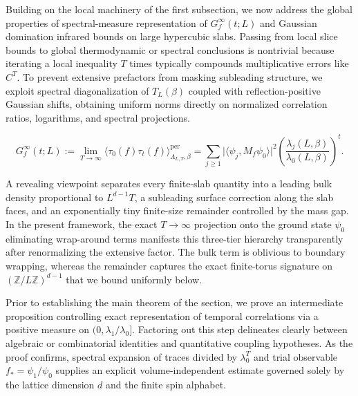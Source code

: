 \documentclass[11pt]{article}
\theoremstyle{definition}
\begin{document}
Building on the local machinery of the first subsection, we now address the global
properties of spectral-measure representation of $G_f^\infty(t; L)$ and Gaussian
domination infrared bounds on large hypercubic slabs. Passing from local slice
bounds to global thermodynamic or spectral conclusions is nontrivial because
iterating a local inequality $T$ times typically compounds multiplicative errors
like $C^T$. To prevent extensive prefactors from masking subleading structure, we
exploit spectral diagonalization of $T_L(\beta)$ coupled with reflection-positive
Gaussian shifts, obtaining uniform norms directly on normalized correlation ratios,
logarithms, and spectral projections.

\[
  G_f^\infty(t; L) := \lim_{T \to \infty} \langle \tau_0(f) \tau_t(f) \rangle_{\Lambda_{L,T},\beta}^{\mathrm{per}} = \sum_{j \ge 1} \bigl|\langle \psi_j, M_f \psi_0 \rangle\bigr|^2 \left(\frac{\lambda_j(L, \beta)}{\lambda_0(L, \beta)}\right)^t.
\]

A revealing viewpoint separates every finite-slab quantity into a leading bulk
density proportional to $L^{d-1} T$, a subleading surface correction along the slab
faces, and an exponentially tiny finite-size remainder controlled by the mass gap.
In the present framework, the exact $T \to \infty$ projection onto the ground state
$\psi_0$ eliminating wrap-around terms manifests this three-tier hierarchy
transparently after renormalizing the extensive factor. The bulk term is oblivious
to boundary wrapping, whereas the remainder captures the exact finite-torus
signature on $(\mathbb{Z}/L\mathbb{Z})^{d-1}$ that we bound uniformly below.

Prior to establishing the main theorem of the section, we prove an intermediate
proposition controlling exact representation of temporal correlations via a positive
measure on $(0, \lambda_1/\lambda_0]$. Factoring out this step delineates clearly
between algebraic or combinatorial identities and quantitative coupling hypotheses.
As the proof confirms, spectral expansion of traces divided by $\lambda_0^T$ and
trial observable $f_* = \psi_1 / \psi_0$ supplies an explicit volume-independent
estimate governed solely by the lattice dimension $d$ and the finite spin alphabet.
\end{document}
